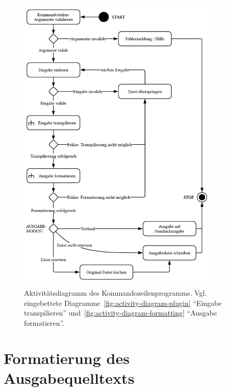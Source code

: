 \begin{figure}[tbp]
  \centering
  \includegraphics[width=0.85\textwidth]{src/4_Umsetzung/fig/activity-diagram-cli.pdf}
	\caption[Aktivitätsdiagramm des Kommandozeilenprogramms]{Aktivitätsdiagramm des Kommandozeilenprogramms. Vgl. eingebettete Diagramme~\ref{fig:activity-diagram-plugin} \enquote{Eingabe transpilieren} und~\ref{fig:activity-diagram-formatting} \enquote{Ausgabe formatieren}.}
	\label{fig:activity-diagram-cli}
\end{figure}

\section{Formatierung des Ausgabequelltexts}


